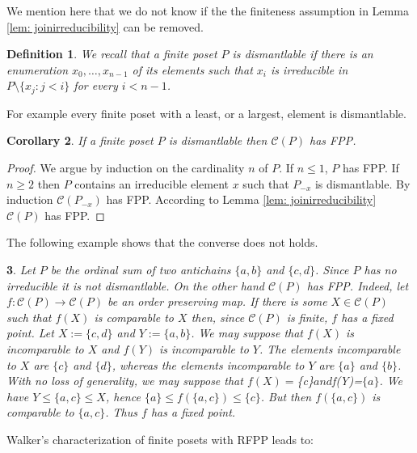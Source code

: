 \documentclass[12pt]{amsart}
\newtheorem{definition}{{\bf Definition}}[section]
\newtheorem{corollary}[definition]{{\bf Corollary}}
\newtheorem{example}[definition]{\noindent {\bf Example}}
\begin{document}
 
We mention here that we do not know if the the finiteness assumption
in Lemma \ref {lem: joinirreducibility} can be removed.

\begin{definition} 
We recall that a finite poset $P$ is \emph{dismantlable} if there is
an enumeration $x_0, \dots , x_{n-1}$ of its elements such that
$x_{i}$ is irreducible in $P\setminus \{x_j:j<i\}$ for every
$i<n-1$. 
\end{definition}

For example every finite poset with a least, or a largest, element is
dismantlable.

\begin{corollary}\label{cor:dismantlable} 
If a finite poset $P$ is dismantlable then $\mathcal C (P)$ has FPP.
\end{corollary} 

\begin{proof} 
We argue by induction on the cardinality $n$ of $P$. If $n\leq 1$, $P$
has FPP. If $n\geq 2$ then $P$ contains an irreducible element $x$
such that $P_{-x}$ is dismantlable.  By induction $\mathcal C
(P_{-x})$ has FPP. According to Lemma \ref {lem: joinirreducibility}
$\mathcal C (P)$ has FPP.
\end{proof}
 
The following example shows that the converse does not holds.

\begin{example}\label{examplenondismantlable} 
Let $P$ be the ordinal sum of two antichains $\{a,b\}$ and
$\{c,d\}$. Since $P$ has no irreducible it is not dismantlable. On the
other hand $\mathcal C (P)$ has FPP. Indeed, let $f:\mathcal C
(P)\rightarrow \mathcal C (P)$ be an order preserving map. If there is
some $X\in \mathcal C (P)$ such that $f(X)$ is comparable to $X$ then,
since $\mathcal C (P)$ is finite, $f$ has a fixed point. Let $X:=\{c,
d\}$ and $Y:=\{a, b\}$. We may suppose that $f(X)$ is incomparable to
$X$ and $f(Y)$ is incomparable to $Y$. The elements incomparable to
$X$ are $\{c\}$ and $\{d\}$, whereas the elements incomparable to $Y$
are $\{a\}$ and $\{b\}$. With no loss of generality, we may suppose
that $f(X)=$\{c\}$ and $f(Y)=$\{a\}$. We have $Y\leq\{a, c\}\leq X$,
hence $\{a\}\leq f(\{a, c\})\leq
\{c\}$. But then $f(\{a, c\})$ is comparable to $\{a, c\}$. Thus $f$
has a fixed point.
\end{example}

Walker's characterization of finite posets with RFPP leads to:
\end{document}
